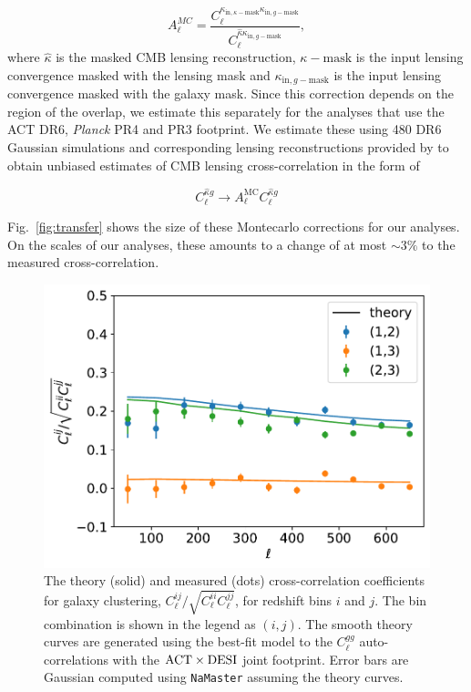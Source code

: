 \documentclass[twocolumn]{aastex631}
\begin{document}
{\begin{equation}
    A^{MC}_\ell=\frac{C^{{\kappa_{\mathrm{in,}{\kappa-\mathrm{mask}}}}{\kappa_{\mathrm{in,}{g-\mathrm{mask}}}}}_\ell}{C^{\hat{\kappa}{\kappa_{\mathrm{in,}{g-\mathrm{mask}}}}}_\ell},
\end{equation}
{where $\hat{\kappa}$ is the masked CMB lensing reconstruction, $\kappa-\mathrm{mask}$ is the input lensing convergence masked with the lensing mask and $\kappa_{\mathrm{in,}{g-\mathrm{mask}}}$ is the input lensing convergence masked with the galaxy mask. Since this correction depends on the region of the overlap, we estimate this separately for the analyses that use the ACT DR6, \textit{Planck} PR4 and PR3 footprint. We estimate these using 480 DR6 Gaussian simulations and corresponding lensing reconstructions provided by \citep{Carron:2022} to obtain unbiased estimates of CMB lensing cross-correlation in the form of }

\begin{equation}
 C^{\hat{\kappa}g}_\ell\rightarrow{A}^{\mathrm{MC}}_\ell{C}^{\hat{\kappa}g}_\ell
\end{equation}

Fig.~\ref{fig:transfer} shows the size of these Montecarlo corrections for our analyses. On the scales of our analyses, these amounts to a change of at most $\sim3\%$ to the measured cross-correlation.


\begin{figure}
    \centering
    \includegraphics[width=\linewidth]{figures/clgg-off-diag.pdf}
    \caption{The theory (solid) and measured (dots) cross-correlation coefficients for galaxy clustering, $C_{\ell}^{ij}/\sqrt{C_{\ell}^{ii}C_{\ell}^{jj}}$, for redshift bins $i$ and $j$. The bin combination is shown in the legend as $(i,j)$. The smooth theory curves are generated using the best-fit \cite{hang2021} model to the $C_{\ell}^{gg}$ auto-correlations with the ${\rm ACT} \times {\rm DESI}$ joint footprint. Error bars are Gaussian computed using \texttt{NaMaster} assuming the theory curves.}
    \label{fig:clgg-off-diag}
\end{figure}


}
\end{document}
